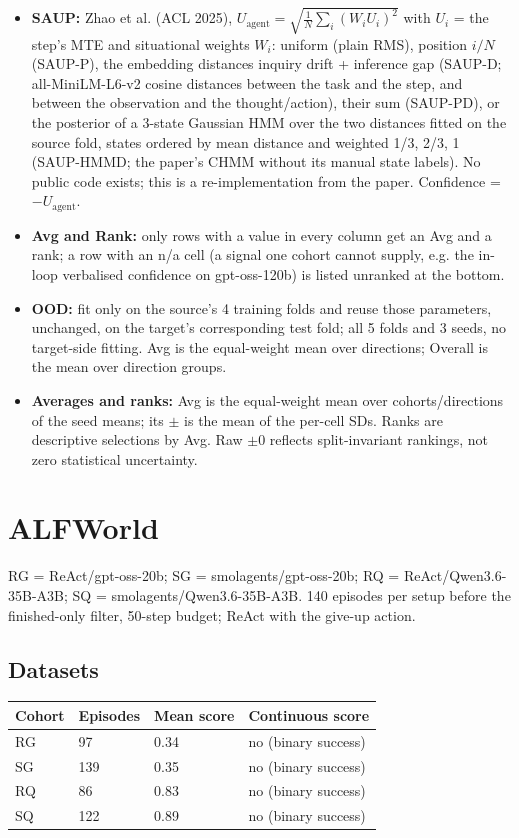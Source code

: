 \documentclass[10pt,a4paper]{article}
\begin{document}
\begin{itemize}
\item \textbf{SAUP:} Zhao et al. (ACL 2025), \ensuremath{U_{\mathrm{agent}} = \sqrt{\tfrac{1}{N}\sum_i (W_i U_i)^2}} with \ensuremath{U_i} = the step's MTE and situational weights \ensuremath{W_i}: uniform (plain RMS), position \ensuremath{i/N} (SAUP-P), the embedding distances inquiry drift + inference gap (SAUP-D; all-MiniLM-L6-v2 cosine distances between the task and the step, and between the observation and the thought/action), their sum (SAUP-PD), or the posterior of a 3-state Gaussian HMM over the two distances fitted on the source fold, states ordered by mean distance and weighted 1/3, 2/3, 1 (SAUP-HMMD; the paper's CHMM without its manual state labels). No public code exists; this is a re-implementation from the paper. Confidence = \ensuremath{-U_{\mathrm{agent}}}.
\item \textbf{Avg and Rank:} only rows with a value in every column get an Avg and a rank; a row with an n/a cell (a signal one cohort cannot supply, e.g. the in-loop verbalised confidence on gpt-oss-120b) is listed unranked at the bottom.
\item \textbf{OOD:} fit only on the source's 4 training folds and reuse those parameters, unchanged, on the target's corresponding test fold; all 5 folds and 3 seeds, no target-side fitting. Avg is the equal-weight mean over directions; Overall is the mean over direction groups.
\item \textbf{Averages and ranks:} Avg is the equal-weight mean over cohorts/directions of the seed means; its \ensuremath{\pm} is the mean of the per-cell SDs. Ranks are descriptive selections by Avg. Raw \ensuremath{\pm}0 reflects split-invariant rankings, not zero statistical uncertainty.
\end{itemize}
\clearpage
\section*{ALFWorld}
RG = ReAct/gpt-oss-20b; SG = smolagents/gpt-oss-20b; RQ = ReAct/Qwen3.6-35B-A3B; SQ = smolagents/Qwen3.6-35B-A3B. 140 episodes per setup before the finished-only filter, 50-step budget; ReAct with the give-up action.

\Needspace{50mm}
\subsection*{Datasets}
\begin{tabular}{@{}L{60mm}C{30mm}C{30mm}C{40mm}@{}}
\toprule
\textbf{Cohort} & \textbf{Episodes} & \textbf{Mean score} & \textbf{Continuous score} \\
\midrule
RG & 97 & 0.34 & no (binary success) \\
SG & 139 & 0.35 & no (binary success) \\
RQ & 86 & 0.83 & no (binary success) \\
SQ & 122 & 0.89 & no (binary success) \\
\bottomrule
\end{tabular}
\end{document}
